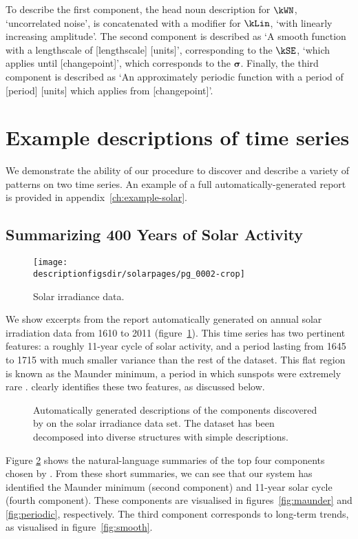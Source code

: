 To describe the first component, the head noun description for $\kWN$, `uncorrelated noise', is concatenated with a modifier for $\kLin$, `with linearly increasing amplitude'.
The second component is described as `A smooth function with a lengthscale of [lengthscale] [units]', corresponding to the $\kSE$, `which applies until [changepoint]', which corresponds to the $\boldsymbol{\sigma}$.
Finally, the third component is described as `An approximately periodic function with a period of [period] [units] which applies from [changepoint]'.


\section{Example descriptions of time series}
\label{sec:examples}
We demonstrate the ability of our procedure to discover and describe a variety of patterns on two time series.
An example of a full automatically-generated report is provided in appendix~\ref{ch:example-solar}.

\subsection{Summarizing 400 Years of Solar Activity}
\label{sec:solar}

\begin{figure}[h]
\centering
\texttt{[image: \\descriptionfigsdir/solarpages/pg\_0002-crop]}
\caption[Solar irradiance data]{
Solar irradiance data.}
\label{fig:solar}
\end{figure}

We show excerpts from the report automatically generated on annual solar irradiation data from 1610 to 2011 (figure~\ref{fig:solar}).
This time series has two pertinent features: a roughly 11-year cycle of solar activity, and a period lasting from 1645 to 1715 with much smaller variance than the rest of the dataset.
This flat region is known as the Maunder minimum, a period in which sunspots were extremely rare \citep{Lean1995-vp}.
\procedurename{} clearly identifies these two features, as discussed below.

\begin{figure}[h]
\centering
{}
\caption[Summaries generated by \procedurename{} for the solar irradiance data.]{
Automatically generated descriptions of the components discovered by \procedurename{} on the solar irradiance data set.
The dataset has been decomposed into diverse structures with simple descriptions.}
\label{fig:exec}
\end{figure}
Figure \ref{fig:exec} shows the natural-language summaries of the top four components chosen by \procedurename{}.
From these short summaries, we can see that our system has identified the Maunder minimum (second component) and 11-year solar cycle (fourth component).
These components are visualised in figures~\ref{fig:maunder} and \ref{fig:periodic}, respectively. 
The third component corresponds to long-term trends, as visualised in figure~\ref{fig:smooth}.

